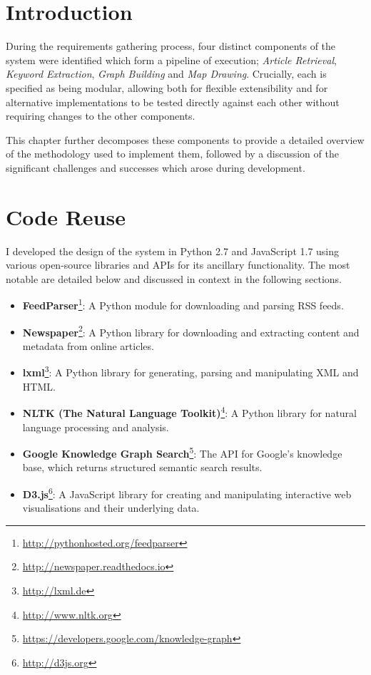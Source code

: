 \section{Introduction}
During the requirements gathering process, four distinct components of the system were identified which form a pipeline of execution; \textit{Article Retrieval}, \textit{Keyword Extraction}, \textit{Graph Building} and \textit{Map Drawing}. Crucially, each is specified as being modular, allowing both for flexible extensibility and for alternative implementations to be tested directly against each other without requiring changes to the other components.

This chapter further decomposes these components to provide a detailed overview of the methodology used to implement them, followed by a discussion of the significant challenges and successes which arose during development.

\section{Code Reuse}
I developed the design of the system in Python 2.7 and JavaScript 1.7 using various open-source libraries and APIs for its ancillary functionality. The most notable are detailed below and discussed in context in the following sections.

\begin{itemize}[noitemsep]
	\item\textbf{FeedParser}\footnote{\url{http://pythonhosted.org/feedparser}}: A Python module for downloading and parsing RSS feeds.
	\item\textbf{Newspaper}\footnote{\url{http://newspaper.readthedocs.io}}: A Python library for downloading and extracting content and metadata from online articles.
	\item\textbf{lxml}\footnote{\url{http://lxml.de}}: A Python library for generating, parsing and manipulating XML and HTML.
	\item\textbf{NLTK (The Natural Language Toolkit)}\footnote{\url{http://www.nltk.org}}: A Python library for natural language processing and analysis.
	\item\textbf{Google Knowledge Graph Search}\footnote{\url{https://developers.google.com/knowledge-graph}}: The API for Google's knowledge base, which returns structured semantic search results.
	\item\textbf{D3.js}\footnote{\url{http://d3js.org}}: A JavaScript library for creating and manipulating interactive web visualisations and their underlying data.
\end{itemize}

